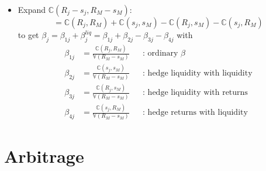 \documentclass[english,10pt
,aspectratio=169
]{beamer}
\begin{document}
\begin{frame}{}
	\begin{itemize}
		\item Expand $\mathbb{C}(R_j-s_j, R_M-s_M)$:
		\[
		=\mathbb{C}(R_j, R_M)+\mathbb{C}(s_j, s_M)-\mathbb{C}(R_j, s_M)-\mathbb{C}(s_j, R_M)
		\]
		to get $\beta_j=\beta_{1j}+\beta^{liq}_j=\beta_{1j}+\beta_{2j}-\beta_{3j}-\beta_{4j}$ with
		\begin{align*}
		\beta_{1j} 	& = \frac{\mathbb{C}(R_j, R_M)}{\mathbb{V}(R_M-s_M)} 	&& \text{: ordinary $\beta$} \\
		\beta_{2j}	& = \frac{\mathbb{C}(s_j, s_M)}{\mathbb{V}(R_M-s_M)}	&& \text{: hedge liquidity with liquidity}\\
		\beta_{3j}	& = \frac{\mathbb{C}(R_j, s_M)}{\mathbb{V}(R_M-s_M)} 	&& \text{: hedge liquidity with returns} \\
		\beta_{4j}	& = \frac{\mathbb{C}(s_j, R_M)}{\mathbb{V}(R_M-s_M)}	&& \text{: hedge returns with liquidity}
		\end{align*}
	\end{itemize}
\end{frame}





\section{Arbitrage}
\end{document}

